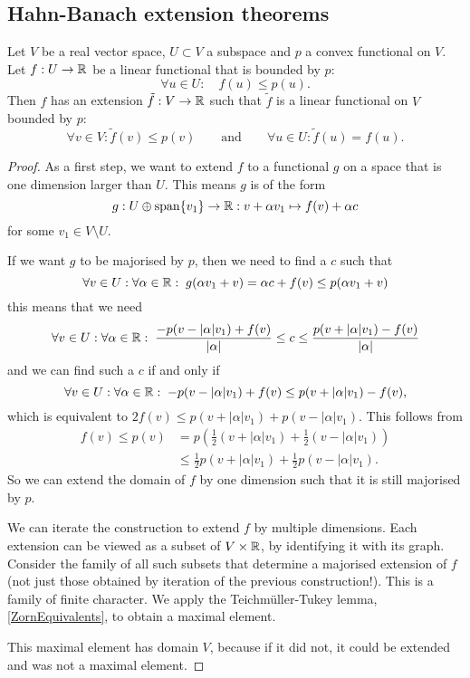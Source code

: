 \subsection{Hahn-Banach extension theorems}
\begin{theorem} \label{convexHahnBanach}
Let $V$ be a real vector space, $U\subset V$ a subspace and $p$ a convex functional on $V$. Let $f:U\to\mathbb{R}$ be a linear functional that is bounded by $p$:
\[ \forall u\in U: \quad f(u) \leq p(u). \]
Then $f$ has an extension $\tilde{f}: V\to \mathbb{R}$ such that $\tilde{f}$ is a linear functional on $V$ bounded by $p$:
\[ \forall v\in V: \tilde{f}(v) \leq p(v) \qquad \text{and} \qquad \forall u\in U: \tilde{f}(u) = f(u). \]
\end{theorem}
\begin{proof}
As a first step, we want to extend $f$ to a functional $g$ on a space that is one dimension larger than $U$. This means $g$ is of the form
\[ g: U\oplus\operatorname{span}\{v_1\}\to\mathbb{R}: v + \alpha v_1 \mapsto f(v) + \alpha c \]
for some $v_1\in V\setminus U$.

If we want $g$ to be majorised by $p$, then we need to find a $c$ such that
\[ \forall v\in U: \forall \alpha\in\mathbb{R}: \; g(\alpha v_1 + v) = \alpha c + f(v) \leq p(\alpha v_1 + v) \]
this means that we need
\[ \forall v\in U: \forall \alpha\in\mathbb{R}:\; \frac{-p(v - |\alpha|v_1) + f(v)}{|\alpha|} \leq c \leq \frac{p(v + |\alpha|v_1) - f(v)}{|\alpha|} \]
and we can find such a $c$ if and only if
\[ \forall v\in U: \forall \alpha\in\mathbb{R}:\; -p(v - |\alpha|v_1) + f(v) \leq p(v + |\alpha|v_1) - f(v), \]
which is equivalent to $2f(v) \leq p(v+|\alpha|v_1)+p(v-|\alpha|v_1)$. This follows from
\begin{align*}
f(v) \leq p(v) &= p(\tfrac{1}{2}(v+|\alpha|v_1) + \tfrac{1}{2}(v-|\alpha|v_1)) \\
&\leq \tfrac{1}{2}p(v+|\alpha|v_1) + \tfrac{1}{2}p(v-|\alpha|v_1).
\end{align*}
So we can extend the domain of $f$ by one dimension such that it is still majorised by $p$.

We can iterate the construction to extend $f$ by multiple dimensions. Each extension can be viewed as a subset of $V\times \mathbb{R}$, by identifying it with its graph.
Consider the family of all such subsets that determine a majorised extension of $f$ (not just those obtained by iteration of the previous construction!). This is a family of finite character. We apply the Teichmüller-Tukey lemma, \ref{ZornEquivalents}, to obtain a maximal element.

This maximal element has domain $V$, because if it did not, it could be extended and was not a maximal element.
\end{proof}
